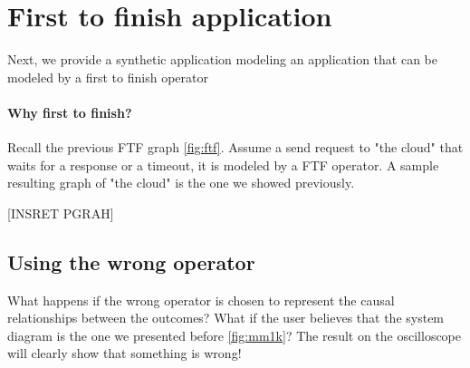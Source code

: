 \section{First to finish application}
    Next, we provide a synthetic application modeling an application that can be modeled by a first to finish operator

    \paragraph{Why first to finish?} Recall the previous FTF graph \ref{fig:ftf}. Assume a send request to "the cloud" that waits for a response or a timeout, it is modeled by a FTF operator. A sample resulting graph of "the cloud" is the one we showed previously.
   
   [INSRET PGRAH]
   \subsection{Using the wrong operator}
        What happens if the wrong operator is chosen to represent the causal relationships between the outcomes? What if the user believes that the system diagram is the one we presented before \ref{fig:mm1k}? The result on the oscilloscope will clearly show that something is wrong! 

